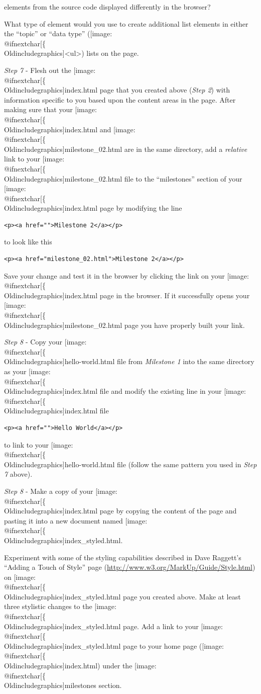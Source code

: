 \documentclass[]{book}
\makeatletter
\providecommand{\tightlist}{%
  \setlength{\itemsep}{0pt}\setlength{\parskip}{0pt}}
\def\ScaleIfNeeded{%
  \ifdim\Gin@nat@width>.5\linewidth
    .5\linewidth
  \else
    \Gin@nat@width
  \fi
}
\let\Oldincludegraphics\texttt{[image: \%
 \\catcode`\\@=11\\relax\%
 \%\\gdef\\includegraphics\{\\@ifnextchar[\{\\Oldincludegraphics]}{\Oldincludegraphics[width=\ScaleIfNeeded]}}%
\gdef\texttt{[image: \\@ifnextchar[\{\\Oldincludegraphics]}{\Oldincludegraphics[max size={.75\textwidth}{.75\textheight}]}}%
\makeatother
\begin{document}
elements from the source code displayed differently in the browser?

\begin{description}
\tightlist
\item[Question 3]
What type of element would you use to create additional list elements in
either the ``topic'' or ``data type''
(\texttt{\textless{}ul\textgreater{}}) lists on the page.
\end{description}

\emph{Step 7} - Flesh out the \texttt{index.html} page that you created
above (\emph{Step 2}) with information specific to you based upon the
content areas in the page. After making sure that your
\texttt{index.html} and \texttt{milestone\_02.html} are in the same
directory, add a \emph{relative} link to your
\texttt{milestone\_02.html} file to the ``milestones'' section of your
\texttt{index.html} page by modifying the line

\begin{verbatim}
<p><a href="">Milestone 2</a></p>
\end{verbatim}

to look like this

\begin{verbatim}
<p><a href="milestone_02.html">Milestone 2</a></p>
\end{verbatim}

Save your change and test it in the browser by clicking the link on your
\texttt{index.html} page in the browser. If it successfully opens your
\texttt{milestone\_02.html} page you have properly built your link.

\emph{Step 8} - Copy your \texttt{hello-world.html} file from
\emph{Milestone 1} into the same directory as your \texttt{index.html}
file and modify the existing line in your \texttt{index.html} file

\begin{verbatim}
<p><a href="">Hello World</a></p>
\end{verbatim}

to link to your \texttt{hello-world.html} file (follow the same pattern
you used in \emph{Step 7} above).

\emph{Step 8} - Make a copy of your \texttt{index.html} page by copying
the content of the page and pasting it into a new document named
\texttt{index\_styled.html}.

Experiment with some of the styling capabilities described in Dave
Raggett's ``Adding a Touch of Style'' page
(\url{http://www.w3.org/MarkUp/Guide/Style.html}) on
\texttt{index\_styled.html} page you created above. Make at least three
stylistic changes to the \texttt{index\_styled.html} page. Add a link to
your \texttt{index\_styled.html} page to your home page
(\texttt{index.html}) under the \texttt{milestones} section.
\end{document}
